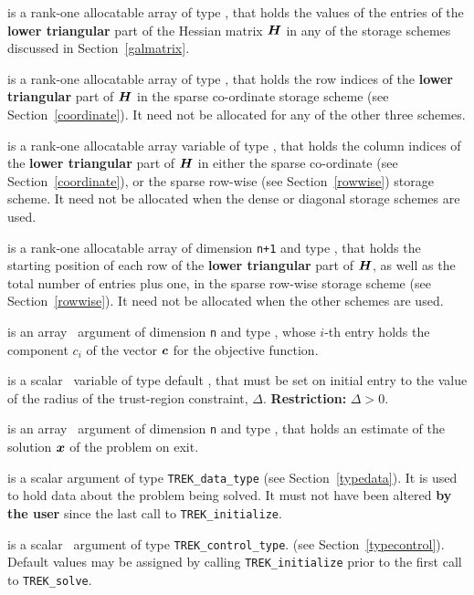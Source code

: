 \documentclass{galahad}
\newcommand{\packagename}{TREK}
\begin{document}
\begin{description}
\begin{description}
 is a rank-one allocatable array of type \realdp, that holds
the values of the entries of the {\bf lower triangular} part
of the Hessian matrix ${\bm{H}}$ in any of the
storage schemes discussed in Section~\ref{galmatrix}.

 is a rank-one allocatable array of type \integer,
that holds the row indices of the {\bf lower triangular} part of ${\bm{H}}$
in the sparse co-ordinate storage
scheme (see Section~\ref{coordinate}).
It need not be allocated for any of the other three schemes.

 is a rank-one allocatable array variable of type \integer,
that holds the column indices of the {\bf lower triangular} part of
${\bm{H}}$ in either the sparse co-ordinate
(see Section~\ref{coordinate}), or the sparse row-wise
(see Section~\ref{rowwise}) storage scheme.
It need not be allocated when the dense or diagonal storage schemes are used.

 is a rank-one allocatable array of dimension {\tt n+1} and type
\integer, that holds the starting position of
each row of the {\bf lower triangular} part of ${\bm{H}}$, as well
as the total number of entries plus one, in the sparse row-wise storage
scheme (see Section~\ref{rowwise}). It need not be allocated when the
other schemes are used.

\end{description}

 is an array \intentin\ argument of dimension {\tt n} and
type \realdp,  whose $i$-th entry holds the component $c_i$ of
the vector ${\bm{c}}$ for the objective function.

 is a scalar \intentin\ variable of type default \realdp,
that must be set on initial entry
to the value of the radius of the trust-region constraint, $\Delta$.
{\bf Restriction: } $\Delta > 0$.

 is an array \intentout\ argument of dimension {\tt n} and
type \realdp, that holds an estimate of the solution ${\bm{x}}$
of the problem on exit.

 is a scalar \intentinout argument of type
{\tt \packagename\_data\_type}
(see Section~\ref{typedata}). It is used to hold data about the problem being
solved. It must not have been altered {\bf by the user} since the last call to
{\tt \packagename\_initialize}.

 is a scalar \intentin\ argument of type
{\tt \packagename\_control\_type}.
(see Section~\ref{typecontrol}).
Default values may be assigned by calling {\tt \packagename\_initialize}
prior to the first call to {\tt \packagename\_solve}.


\end{description}
\end{document}
